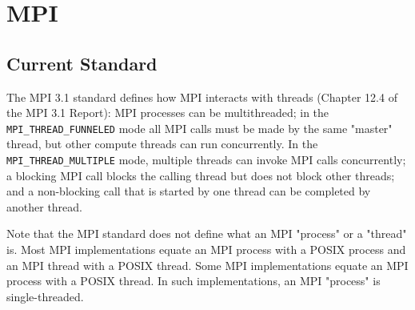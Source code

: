 \section{MPI}
\subsection{Current Standard}
	The MPI 3.1 standard defines how MPI interacts with threads (Chapter 12.4 
	of the
	MPI 3.1 Report): MPI processes can be multithreaded; in the 
	\texttt{MPI\_THREAD\_FUNNELED} mode all MPI calls must be made by the same 
	"master" thread, but other compute threads can run concurrently. In the 
	\texttt{MPI\_THREAD\_MULTIPLE} mode, multiple threads can invoke MPI calls 
	concurrently; a blocking MPI call blocks the calling thread but does not 
	block other threads; and a 
	non-blocking call that is started by one thread can be completed by another 
	thread. 
	
	Note that the MPI standard does not define what an MPI "process" or  
	a "thread" is. Most MPI implementations equate an MPI process with a POSIX 
	process and an MPI thread with a POSIX thread. Some MPI implementations 
	equate an MPI process with a POSIX thread. In such implementations, an MPI 
	"process" is single-threaded.	
	
